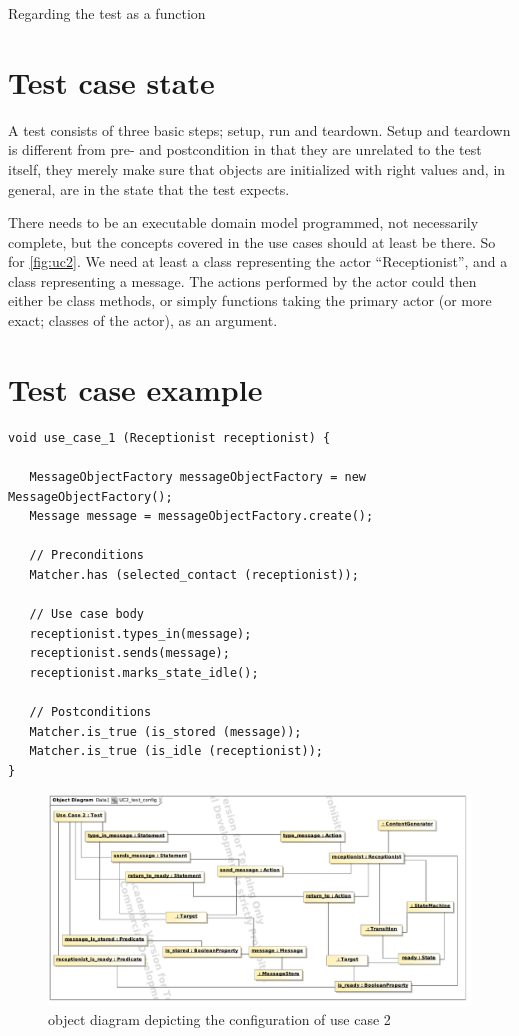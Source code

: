 Regarding the test as a function


\section{Test case state}
A test consists of three basic steps; setup, run and teardown. Setup and teardown is different from pre- and postcondition in that they are unrelated to the test itself, they merely make sure that objects are initialized with right values and, in general, are in the state that the test expects.

There needs to be an executable domain model programmed, not necessarily complete, but the concepts covered in the use cases should at least be there. So for \ref{fig:uc2}. We need at least a class representing the actor ``Receptionist'', and a class representing a message. The actions performed by the actor could then either be class methods, or simply functions taking the primary actor (or more exact; classes of the actor), as an argument.


\label{sec:test_case_state}


\section{Test case example}
\begin{lstlisting}
void use_case_1 (Receptionist receptionist) {

   MessageObjectFactory messageObjectFactory = new MessageObjectFactory();
   Message message = messageObjectFactory.create();

   // Preconditions
   Matcher.has (selected_contact (receptionist));

   // Use case body 
   receptionist.types_in(message);
   receptionist.sends(message);
   receptionist.marks_state_idle();

   // Postconditions 
   Matcher.is_true (is_stored (message));
   Matcher.is_true (is_idle (receptionist));
}
\end{lstlisting}

\begin{figure}
  \centering
 
  \includegraphics[scale=0.65]{img/uc2_test_config}
  \caption{object diagram depicting the configuration of use case 2}
  \label{fig:uc2_object_diagram}
\end{figure}



